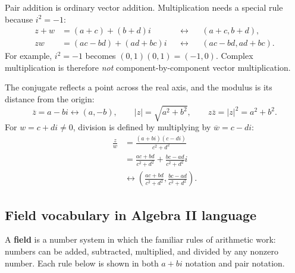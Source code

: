 \documentclass[12pt]{article}
\begin{document}
Pair addition is ordinary vector addition. Multiplication needs a special rule because $i^2=-1$:
\[
\begin{aligned}
 z+w&=(a+c)+(b+d)i
      &&\longleftrightarrow&&(a+c,b+d),\\
 zw&=(ac-bd)+(ad+bc)i
      &&\longleftrightarrow&&(ac-bd,ad+bc).
\end{aligned}
\]
For example, $i^2=-1$ becomes $(0,1)(0,1)=(-1,0)$. Complex multiplication is therefore \emph{not} component-by-component vector multiplication.

The conjugate reflects a point across the real axis, and the modulus is its distance from the origin:
\[
  \overline z=a-bi\longleftrightarrow(a,-b),
  \qquad |z|=\sqrt{a^2+b^2},
  \qquad z\overline z=|z|^2=a^2+b^2.
\]
For $w=c+di\ne0$, division is defined by multiplying by $\overline w=c-di$:
\[
\begin{aligned}
  \frac zw
  &=\frac{(a+bi)(c-di)}{c^2+d^2}\\
  &=\frac{ac+bd}{c^2+d^2}
    +\frac{bc-ad}{c^2+d^2}i\\
  &\longleftrightarrow
  \left(\frac{ac+bd}{c^2+d^2},
        \frac{bc-ad}{c^2+d^2}\right).
\end{aligned}
\]

\subsection*{Field vocabulary in Algebra II language}
A \textbf{field} is a number system in which the familiar rules of arithmetic work: numbers can be added, subtracted, multiplied, and divided by any nonzero number. Each rule below is shown in both $a+bi$ notation and pair notation.
\end{document}
